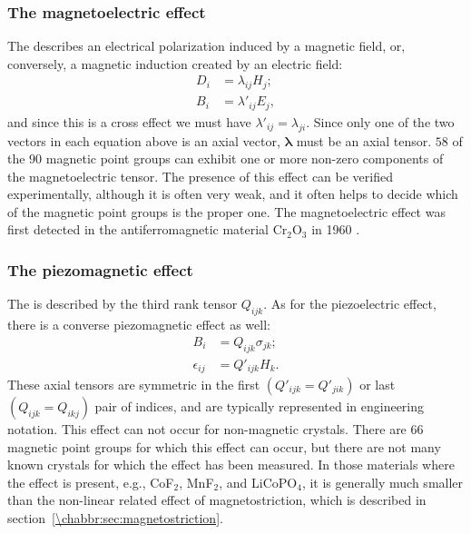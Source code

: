 \subsubsection{The magnetoelectric effect}\label{\chabbr:ssec:magnetoelectric}

The  describes an electrical polarization induced by a magnetic field, or, conversely, a magnetic induction created by an electric field:
\begin{align}
	D_i &= \lambda_{ij} H_j;\\
	B_i &= \lambda'_{ij} E_j,
\end{align}
and since this is a cross effect we must have $\lambda'_{ij} = \lambda_{ji}$.  Since only one of the two vectors in each equation above is an axial vector, $\bm{\lambda}$ must be an axial tensor.  $58$ of the $90$ magnetic point groups can exhibit one or more non-zero components of the magnetoelectric tensor.  The presence of this effect can be verified experimentally, although it is often very weak, and it often helps to decide which of the magnetic point groups is the proper one.  The magnetoelectric effect was first detected in the antiferromagnetic material Cr$_2$O$_3$ in 1960 \cite{astrov1960a}.


\subsubsection{The piezomagnetic effect}\label{\chabbr:ssec:piezomagnetic}

The  is described by the third rank tensor $Q_{ijk}$.  As for the piezoelectric effect, there is a converse piezomagnetic effect as well:
\begin{align}
	B_i &= Q_{ijk} \sigma_{jk};\\
	\epsilon_{ij} &= Q'_{ijk} H_k.
\end{align}
These axial tensors are symmetric in the first $(Q'_{ijk}=Q'_{jik})$ or last $(Q_{ijk}=Q_{ikj})$ pair of indices, and are typically represented in engineering notation.  This effect can not occur for non-magnetic crystals. There are $66$ magnetic point groups for which this effect can occur, but there are not many known crystals for which the effect has been measured.  In those materials where the effect is present, e.g., CoF$_2$, MnF$_2$, and LiCoPO$_4$, it is generally much smaller than the non-linear related effect of magnetostriction, which is described in section~\ref{\chabbr:sec:magnetostriction}.



